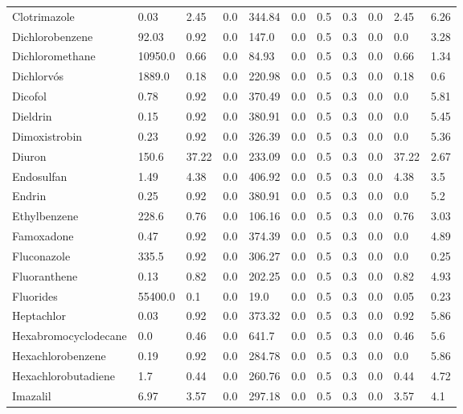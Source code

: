 \begin{tabular}{lllllllllll}
\cline{1-11}
Clotrimazole & 0.03 & 2.45 & 0.0 & 344.84 & 0.0 & 0.5 & 0.3 & 0.0 & 2.45 & 6.26 \\
\cline{1-11}
Dichlorobenzene & 92.03 & 0.92 & 0.0 & 147.0 & 0.0 & 0.5 & 0.3 & 0.0 & 0.0 & 3.28 \\
\cline{1-11}
Dichloromethane & 10950.0 & 0.66 & 0.0 & 84.93 & 0.0 & 0.5 & 0.3 & 0.0 & 0.66 & 1.34 \\
\cline{1-11}
Dichlorvós & 1889.0 & 0.18 & 0.0 & 220.98 & 0.0 & 0.5 & 0.3 & 0.0 & 0.18 & 0.6 \\
\cline{1-11}
Dicofol & 0.78 & 0.92 & 0.0 & 370.49 & 0.0 & 0.5 & 0.3 & 0.0 & 0.0 & 5.81 \\
\cline{1-11}
Dieldrin & 0.15 & 0.92 & 0.0 & 380.91 & 0.0 & 0.5 & 0.3 & 0.0 & 0.0 & 5.45 \\
\cline{1-11}
Dimoxistrobin & 0.23 & 0.92 & 0.0 & 326.39 & 0.0 & 0.5 & 0.3 & 0.0 & 0.0 & 5.36 \\
\cline{1-11}
Diuron & 150.6 & 37.22 & 0.0 & 233.09 & 0.0 & 0.5 & 0.3 & 0.0 & 37.22 & 2.67 \\
\cline{1-11}
Endosulfan & 1.49 & 4.38 & 0.0 & 406.92 & 0.0 & 0.5 & 0.3 & 0.0 & 4.38 & 3.5 \\
\cline{1-11}
Endrin & 0.25 & 0.92 & 0.0 & 380.91 & 0.0 & 0.5 & 0.3 & 0.0 & 0.0 & 5.2 \\
\cline{1-11}
Ethylbenzene & 228.6 & 0.76 & 0.0 & 106.16 & 0.0 & 0.5 & 0.3 & 0.0 & 0.76 & 3.03 \\
\cline{1-11}
Famoxadone & 0.47 & 0.92 & 0.0 & 374.39 & 0.0 & 0.5 & 0.3 & 0.0 & 0.0 & 4.89 \\
\cline{1-11}
Fluconazole & 335.5 & 0.92 & 0.0 & 306.27 & 0.0 & 0.5 & 0.3 & 0.0 & 0.0 & 0.25 \\
\cline{1-11}
Fluoranthene & 0.13 & 0.82 & 0.0 & 202.25 & 0.0 & 0.5 & 0.3 & 0.0 & 0.82 & 4.93 \\
\cline{1-11}
Fluorides & 55400.0 & 0.1 & 0.0 & 19.0 & 0.0 & 0.5 & 0.3 & 0.0 & 0.05 & 0.23 \\
\cline{1-11}
Heptachlor & 0.03 & 0.92 & 0.0 & 373.32 & 0.0 & 0.5 & 0.3 & 0.0 & 0.92 & 5.86 \\
\cline{1-11}
Hexabromocyclodecane & 0.0 & 0.46 & 0.0 & 641.7 & 0.0 & 0.5 & 0.3 & 0.0 & 0.46 & 5.6 \\
\cline{1-11}
Hexachlorobenzene & 0.19 & 0.92 & 0.0 & 284.78 & 0.0 & 0.5 & 0.3 & 0.0 & 0.0 & 5.86 \\
\cline{1-11}
Hexachlorobutadiene & 1.7 & 0.44 & 0.0 & 260.76 & 0.0 & 0.5 & 0.3 & 0.0 & 0.44 & 4.72 \\
\cline{1-11}
Imazalil & 6.97 & 3.57 & 0.0 & 297.18 & 0.0 & 0.5 & 0.3 & 0.0 & 3.57 & 4.1 \\

\end{tabular}

